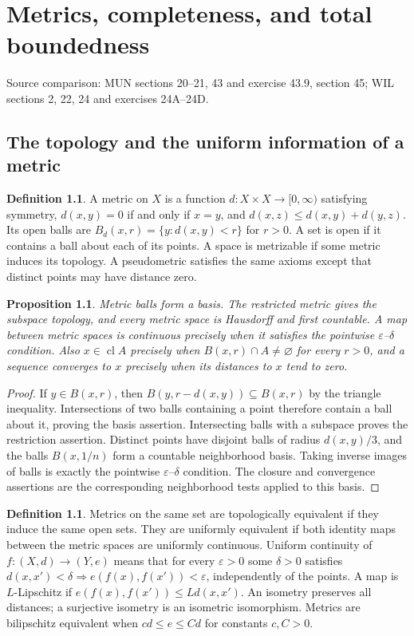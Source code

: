 \documentclass[11pt,oneside,openany]{book}
\newtheorem{proposition}[theorem]{Proposition}
\theoremstyle{definition}
\newtheorem{definition}[theorem]{Definition}
\theoremstyle{remark}
\newcommand{\eps}{\varepsilon}
\DeclareMathOperator{\cl}{cl}
\newcommand{\source}[1]{\par\begingroup\small\sffamily\color{black!65}Source comparison: #1\par\endgroup}
\begin{document}


\chapter{Metrics, completeness, and total boundedness}\label{ch:d10-09}
\source{MUN sections 20--21, 43 and exercise 43.9, section 45; WIL sections 2, 22, 24 and exercises 24A--24D.}

\section{The topology and the uniform information of a metric}
\begin{definition}\label{d10:09:metric}
A metric on $X$ is a function $d:X\times X\to[0,\infty)$ satisfying symmetry, $d(x,y)=0$ if and only if $x=y$, and $d(x,z)\leq d(x,y)+d(y,z)$. Its open balls are $B_d(x,r)=\{y:d(x,y)<r\}$ for $r>0$. A set is open if it contains a ball about each of its points. A space is metrizable if some metric induces its topology. A pseudometric satisfies the same axioms except that distinct points may have distance zero.
\end{definition}

\begin{proposition}\label{d10:09:metric-topology}
Metric balls form a basis. The restricted metric gives the subspace topology, and every metric space is Hausdorff and first countable. A map between metric spaces is continuous precisely when it satisfies the pointwise $\eps$--$\delta$ condition. Also $x\in\cl A$ precisely when $B(x,r)\cap A\ne\varnothing$ for every $r>0$, and a sequence converges to $x$ precisely when its distances to $x$ tend to zero.
\end{proposition}
\begin{proof}
If $y\in B(x,r)$, then $B(y,r-d(x,y))\subseteq B(x,r)$ by the triangle inequality. Intersections of two balls containing a point therefore contain a ball about it, proving the basis assertion. Intersecting balls with a subspace proves the restriction assertion. Distinct points have disjoint balls of radius $d(x,y)/3$, and the balls $B(x,1/n)$ form a countable neighborhood basis. Taking inverse images of balls is exactly the pointwise $\eps$--$\delta$ condition. The closure and convergence assertions are the corresponding neighborhood tests applied to this basis.
\end{proof}

\begin{definition}\label{d10:09:equivalences}
Metrics on the same set are topologically equivalent if they induce the same open sets. They are uniformly equivalent if both identity maps between the metric spaces are uniformly continuous. Uniform continuity of $f:(X,d)\to(Y,e)$ means that for every $\eps>0$ some $\delta>0$ satisfies $d(x,x')<\delta\Rightarrow e(f(x),f(x'))<\eps$, independently of the points. A map is $L$-Lipschitz if $e(f(x),f(x'))\leq Ld(x,x')$. An isometry preserves all distances; a surjective isometry is an isometric isomorphism. Metrics are bilipschitz equivalent when $cd\leq e\leq Cd$ for constants $c,C>0$.
\end{definition}
\end{document}
